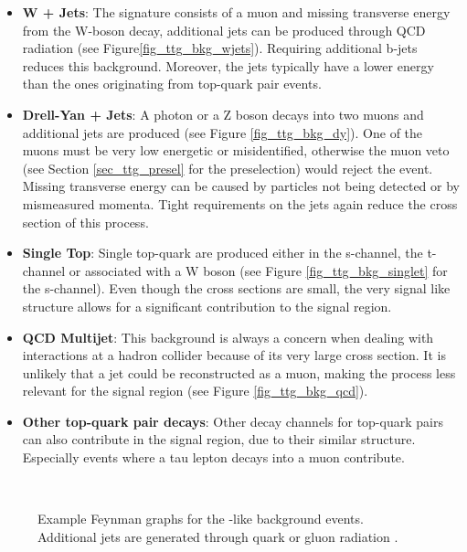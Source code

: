 \begin{itemize}
\item \textbf{W + Jets}: The signature consists of a muon and missing transverse energy from the W-boson decay, additional jets can be produced through QCD radiation (see Figure\ref{fig_ttg_bkg_wjets}). Requiring additional b-jets reduces this background. Moreover, the jets typically have a lower energy than the ones originating from top-quark pair events.
\item \textbf{Drell-Yan + Jets}: A photon or a Z boson decays into two muons and additional jets are produced (see Figure \ref{fig_ttg_bkg_dy}). One of the muons must be very low energetic or misidentified, otherwise the muon veto (see Section \ref{sec_ttg_presel} for the preselection) would reject the event. Missing transverse energy can be caused by particles not being detected or by mismeasured momenta. Tight requirements on the jets again reduce the cross section of this process.
\item \textbf{Single Top}: Single top-quark are produced either in the s-channel, the t-channel or associated with a W boson (see Figure \ref{fig_ttg_bkg_singlet} for the s-channel). Even though the cross sections are small, the very signal like structure allows for a significant contribution to the signal region.
\item \textbf{QCD Multijet}: This background is always a concern when dealing with interactions at a hadron collider because of its very large cross section. It is unlikely that a jet could be reconstructed as a muon, making the process less relevant for the signal region (see Figure \ref{fig_ttg_bkg_qcd}).
\item \textbf{Other top-quark pair decays}: Other decay channels for top-quark pairs can also contribute in the signal region, due to their similar structure. Especially events where a tau lepton decays into a muon contribute. 
\end{itemize}

\begin{figure}[ht]
 \\
  \caption{Example Feynman graphs for the \ttbar-like background events. Additional jets are generated through quark or gluon radiation \cite{steeger}.}
  \label{fig_ttg_bkg}
\end{figure}

